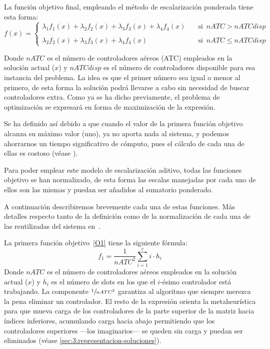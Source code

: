 La función objetivo final, empleando el método de escalarización ponderada tiene esta forma:
\[
    f(x)=
    \begin{cases}
        \lambda_1 f_1(x) + \lambda_2 f_2(x) + \lambda_3 f_3(x) + \lambda_4 f_4(x) & \quad \textrm{si } \, nATC > nATCdisp  \\
        \\
        \lambda_2 f_2(x) + \lambda_3 f_3(x) + \lambda_4 f_4(x)                    & \quad \textrm{si } \,  nATC \le nATCdisp
    \end{cases}
\]

Donde $nATC$ es el número de controladores aéreos (ATC) empleados en la solución actual ($x$) y $nATCdisp$ es el número de controladores disponible para esa instancia del problema. La idea es que el primer número sea igual o menor al primero, de esta forma la solución podrá llevarse a cabo sin necesidad de buscar controladores extra. Como ya se ha dicho previamente, el problema de optimización se expresará en forma de maximización de la expresión.

Se ha definido así debido a que cuando el valor de la primera función objetivo alcanza su máximo valor (uno), ya no aporta nada al sistema, y podemos ahorrarnos un tiempo significativo de cómputo, pues el cálculo de cada una de ellas es costoso (véase ).%

Para poder emplear este modelo de escalarización aditivo, todas las funciones objetivo se han normalizado, de esta forma las escalas manejadas por cada uno de ellos son las mismas y puedan ser añadidos al sumatorio ponderado.

A continuación describiremos brevemente cada una de estas funciones. Más detalles respecto tanto de la definición como de la normalización de cada una de las reutilizadas del sistema \legacy{} en~\cite{articulo2}.

La primera función objetivo~\ref{O1} tiene la siguiente fórmula:
\[ f_1 = \frac{1}{nATC^2} \sum_{i=1}^c i\cdot h_i \]
Donde $nATC$ es el número de controladores aéreos empleados en la solución actual ($x$) y $h_i$ es el número de slots en los que el $i$-ésimo controlador está trabajando. La componente $\sfrac{1}{nATC^2}$ garantiza al algoritmo que siempre merezca la pena eliminar un controlador. El resto de la expresión orienta la metaheurística para que mueva carga de los controladores de la parte superior de la matriz hacia índices inferiores, acumulando carga hacia abajo permitiendo que los controladores superiores ---los imaginarios--- se queden sin carga y puedan ser eliminados (véase \autoref{sec:3:representacion-soluciones}).

